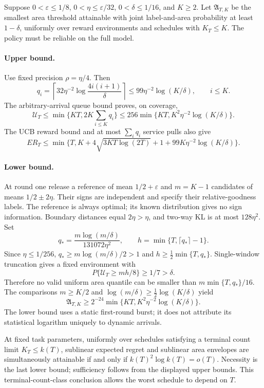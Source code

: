 Suppose $0<\varepsilon\le1/8$, $0<\eta\le\varepsilon/32$,
$0<\delta\le1/16$, and $K\ge2$. Let $\mathfrak A_{T,K}$ be the smallest
area threshold attainable with joint label-and-area probability at least
$1-\delta$, uniformly over reward environments and schedules with $K_T\le K$.
The policy must be reliable on the full model.

\paragraph{Upper bound.}
Use fixed precision $\rho=\eta/4$. Then
\[
 q_i=\left\lceil32\eta^{-2}\log\frac{4i(i+1)}\delta\right\rceil
 \le99\eta^{-2}\log(K/\delta),\qquad i\le K.
\]
The arbitrary-arrival queue bound proves, on coverage,
\[
 \mathcal U_T\le\min\{KT,2K\sum_{i\le K}q_i\}
 \le256\min\{KT,K^2\eta^{-2}\log(K/\delta)\}.
\]
The UCB reward bound and at most $\sum_iq_i$ service pulls also give
\[
 ER_T\le\min\{T,K+4\sqrt{3KT\log(2T)}+1+
                  99K\eta^{-2}\log(K/\delta)\}.
\]

\paragraph{Lower bound.}
At round one release a reference of mean $1/2+\varepsilon$ and
$m=K-1$ candidates of means $1/2\pm2\eta$. Their signs are independent and
specify their relative-goodness labels. The reference is always optimal;
its known distribution gives no sign information. Boundary distances equal
$2\eta>\eta$, and two-way KL is at most $128\eta^2$. Set
\[
 q_* =\frac{m\log(m/\delta)}{131072\eta^2},\qquad
 h=\min\{T,\lceil q_*\rceil-1\}.
\]
Since $\eta\le1/256$, $q_*\ge m\log(m/\delta)/2>1$ and
$h\ge\frac12\min\{T,q_*\}$. Single-window truncation gives a fixed
environment with
\[
 P\{\mathcal U_T\ge mh/8\}\ge1/7>\delta.
\]
Therefore no valid uniform area quantile can be smaller than
$m\min\{T,q_*\}/16$. The comparisons
$m\ge K/2$ and $\log(m/\delta)\ge\frac12\log(K/\delta)$ yield
\[
 \mathfrak A_{T,K}\ge
 2^{-24}\min\{KT,K^2\eta^{-2}\log(K/\delta)\}.
\]
The lower bound uses a static first-round burst; it does not attribute its
statistical logarithm uniquely to dynamic arrivals.

At fixed task parameters, uniformly over schedules satisfying a terminal
count limit $K_T\le k(T)$, sublinear expected regret and sublinear area
envelopes are simultaneously attainable if and only if
$k(T)^2\log k(T)=o(T)$. Necessity is the last lower bound; sufficiency follows
from the displayed upper bounds. This terminal-count-class conclusion
allows the worst schedule to depend on $T$.


